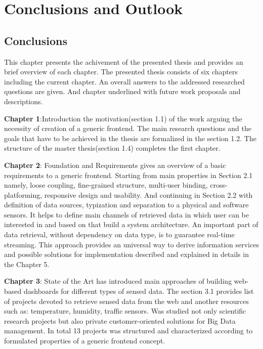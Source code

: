 \chapter{Conclusions and Outlook}

\section{Conclusions}
	This chapter presents the achivement of the presented thesis and provides an brief overview of each chapter.  The presented thesis consists of six chapters including the current chapter. An overall answers to the addressed researched questions are given. And chapter underlined with future work proposals and descriptions.

	\textbf{Chapter 1}:Introduction
	\newline
	 the motivation(section 1.1) of the work arguing the necessity of creation of a generic frontend. The main research questions and the goals that have to be achieved in the thesis are formalized in the section 1.2. The structure of the master thesis(section 1.4) completes the first chapter. 
   
    \textbf{Chapter 2}: Foundation and Requirements
    \newline
    gives an overview of a basic requirements to a generic frontend. Starting from main properties in Section 2.1 namely, loose coupling, fine-grained structure, multi-user binding, cross-platforming, responsive design and usability. And continuing in Section 2.2 with definition of data sources, typization and separation to a physical and software sensors. It helps to define main channels of retrieved data in which user can be interested in and based on that build a system architecture. An important part of data retrieval, without dependency on data type, is to guarantee real-time streaming. This approach provides an universal way to derive information services and possible solutions for implementation described and explained in details in the Chapter 5.
    
    \textbf{Chapter 3}: State of the Art
    \newline
	has introduced main approaches of building web-based dashboards for different types of sensed data. The section 3.1 provides list of projects devoted to retrieve sensed data from the web and another resources such as: temperature, humidity, traffic sensors. Was studied not only scientific research projects but also private customer-oriented solutions for Big Data management. In total 13 projects was structured and characterized according to formulated properties of a generic frontend concept.

